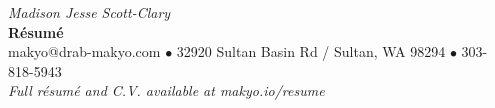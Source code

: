 
\begin{center}
  {\huge \textit{\color{titlegreydark} Madison Jesse Scott-Clary}}\\
  {\Huge{\textbf{R\'esum\'e}}}\\
  {\color{titlegreydark} makyo@drab-makyo.com $\bullet$ 32920 Sultan Basin Rd / Sultan, WA 98294 $\bullet$ 303-818-5943}\\
  {\small \color{titlegreylight} \textit{Full r\'esum\'e and C.V. available at makyo.io/resume}}
\end{center}

